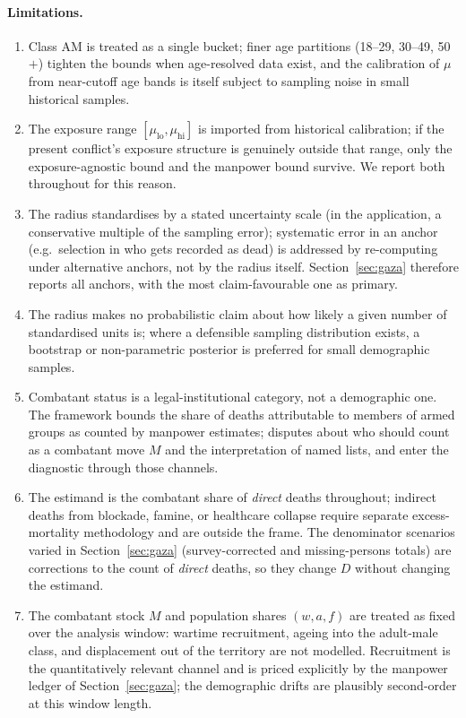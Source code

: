 \paragraph{Limitations.}
\begin{enumerate}[leftmargin=*]
\item Class $\mathrm{AM}$ is treated as a single bucket; finer age partitions (18--29, 30--49, 50$+$) tighten the bounds when age-resolved data exist, and the calibration of $\mu$ from near-cutoff age bands \citep{frost2026} is itself subject to sampling noise in small historical samples.
\item The exposure range $[\mu_{\mathrm{lo}},\mu_{\mathrm{hi}}]$ is imported from historical calibration; if the present conflict's exposure structure is genuinely outside that range, only the exposure-agnostic bound and the manpower bound survive. We report both throughout for this reason.
\item The radius standardises by a stated uncertainty scale (in the application, a conservative multiple of the sampling error); systematic error in an anchor (e.g.\ selection in who gets recorded as dead) is addressed by re-computing under alternative anchors, not by the radius itself. Section~\ref{sec:gaza} therefore reports all anchors, with the most claim-favourable one as primary.
\item The radius makes no probabilistic claim about how likely a given number of standardised units is; where a defensible sampling distribution exists, a bootstrap or non-parametric posterior is preferred for small demographic samples.
\item Combatant status is a legal-institutional category, not a demographic one. The framework bounds the share of deaths attributable to members of armed groups as counted by manpower estimates; disputes about who should count as a combatant move $M$ and the interpretation of named lists, and enter the diagnostic through those channels.
\item The estimand is the combatant share of \emph{direct} deaths throughout; indirect deaths from blockade, famine, or healthcare collapse require separate excess-mortality methodology \citep{checchiroberts2008,burnham2006,degommeguhasapir2010,gomez2025} and are outside the frame. The denominator scenarios varied in Section~\ref{sec:gaza} (survey-corrected and missing-persons totals) are corrections to the count of \emph{direct} deaths, so they change $D$ without changing the estimand.
\item The combatant stock $M$ and population shares $(w,a,f)$ are treated as fixed over the analysis window: wartime recruitment, ageing into the adult-male class, and displacement out of the territory are not modelled. Recruitment is the quantitatively relevant channel and is priced explicitly by the manpower ledger of Section~\ref{sec:gaza}; the demographic drifts are plausibly second-order at this window length.
\end{enumerate}

